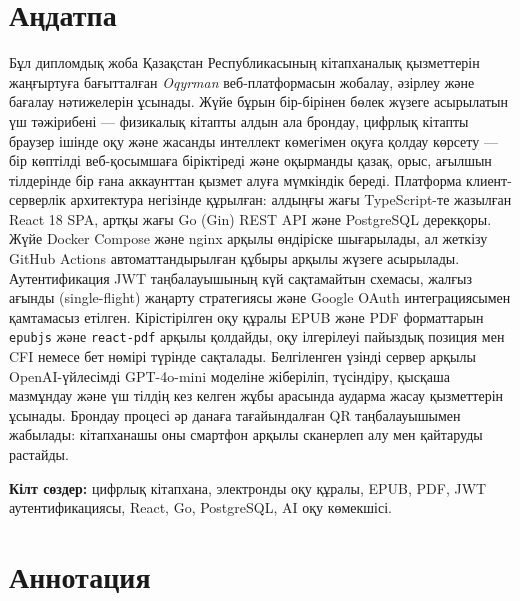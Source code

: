 \documentclass[12pt,a4paper]{report}
\begin{document}
\chapter*{Аңдатпа}

Бұл дипломдық жоба Қазақстан Республикасының кітапханалық қызметтерін
жаңғыртуға бағытталған \textit{Oqyrman} веб-платформасын жобалау, әзірлеу
және бағалау нәтижелерін ұсынады. Жүйе бұрын бір-бірінен бөлек жүзеге
асырылатын үш тәжірибені --- физикалық кітапты алдын ала брондау, цифрлық
кітапты браузер ішінде оқу және жасанды интеллект көмегімен оқуға қолдау
көрсету --- бір көптілді веб-қосымшаға біріктіреді және оқырманды қазақ,
орыс, ағылшын тілдерінде бір ғана аккаунттан қызмет алуға мүмкіндік береді.
Платформа клиент-серверлік архитектура негізінде құрылған: алдыңғы жағы
TypeScript-те жазылған React 18 SPA, артқы жағы Go (Gin) REST API және
PostgreSQL дерекқоры. Жүйе Docker Compose және nginx арқылы өндіріске
шығарылады, ал жеткізу GitHub Actions автоматтандырылған құбыры арқылы
жүзеге асырылады. Аутентификация JWT таңбалауышының күй сақтамайтын схемасы,
жалғыз ағынды (single-flight) жаңарту стратегиясы және Google OAuth
интеграциясымен қамтамасыз етілген. Кірістірілген оқу құралы EPUB және PDF
форматтарын \texttt{epubjs} және \texttt{react-pdf} арқылы қолдайды, оқу
ілгерілеуі пайыздық позиция мен CFI немесе бет нөмірі түрінде сақталады.
Белгіленген үзінді сервер арқылы OpenAI-үйлесімді GPT-4o-mini моделіне
жіберіліп, түсіндіру, қысқаша мазмұндау және үш тілдің кез келген жұбы
арасында аударма жасау қызметтерін ұсынады. Брондау процесі әр данаға
тағайындалған QR таңбалауышымен жабылады: кітапханашы оны смартфон
арқылы сканерлеп алу мен қайтаруды растайды.

\textbf{Кілт сөздер:} цифрлық кітапхана, электронды оқу құралы, EPUB, PDF,
JWT аутентификациясы, React, Go, PostgreSQL, AI оқу көмекшісі.

\chapter*{Аннотация}
\end{document}
